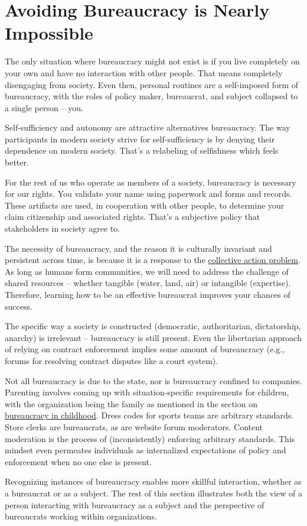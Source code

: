 \section{Avoiding Bureaucracy is Nearly Impossible}

The only situation where bureaucracy might not exist is if you live completely on your own and have no interaction with other people. That means completely disengaging from society. Even then, personal routines are a self-imposed form of bureaucracy, with the roles of policy maker, bureaucrat, and subject collapsed to a single person -- you.

Self-sufficiency and autonomy are attractive alternatives bureaucracy. The way participants in modern society strive for self-sufficiency is by denying their dependence on modern society. That's a relabeling of selfishness which feels better. 

For the rest of us who operate as members of a society, bureaucracy is necessary for our rights. You validate your name using paperwork and forms and records. These artifacts are used, in cooperation with other people, to determine your claim citizenship and associated rights. That's a subjective policy that \glspl{stakeholder} in society agree to. 

The necessity of bureaucracy, and the reason it is culturally invariant and persistent across time, is because it is a response to the 
\href{https://en.wikipedia.org/wiki/Collective_action_problem}{collective action problem}. 
As long as humans form communities, we will need to address the challenge of \glspl{shared resource} -- whether tangible (water, land, air) or intangible (expertise). Therefore, learning how to be an effective bureaucrat improves your chances of success. 

The specific way a society is constructed (democratic, authoritarian, dictatorship, anarchy) is irrelevant -- bureaucracy is still present. Even the libertarian approach of relying on contract enforcement implies some amount of bureaucracy (e.g., forums for resolving contract disputes like a court system). 


Not all bureaucracy is due to the state, nor is bureaucracy confined to companies. Parenting involves coming up with situation-specific requirements for children, with the organization being the family as mentioned in the section 
on \hyperref[sec:bureaucracy-early-childhood]{bureaucracy in childhood}.
Dress codes for sports teams are arbitrary standards. 
Store clerks are bureaucrats, as are website forum moderators.  Content moderation is the process of (inconsistently) enforcing arbitrary standards. This mindset even permeates individuals as internalized expectations of policy and enforcement when no one else is present. 

Recognizing instances of bureaucracy enables more skillful interaction, whether as a bureaucrat or as a subject. The rest of this section  illustrates both the view of a person interacting with bureaucracy as a \gls{subject} and the perspective of bureaucrats working within organizations. 




